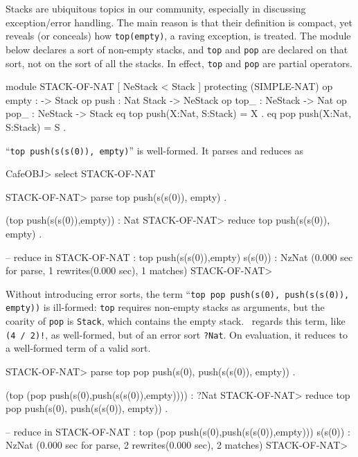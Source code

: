 \documentclass[a4paper]{memoir}
\begin{document}
Stacks are ubiquitous topics in our
community, especially in discussing exception/error handling. The
main reason is that their definition is compact, yet reveals (or
conceals) how \verb|top(empty)|, a raving exception, is treated.
The module below declares a sort of non-empty stacks, and
\verb|top| and \verb|pop| are declared on that sort, not on the sort of
all the stacks. In effect, \verb|top| and \verb|pop| are partial
operators.\label{exs:stack-of-nat}
\begin{vvtm}
\begin{ccode}
  module STACK-OF-NAT {
   [ NeStack < Stack ]
   protecting (SIMPLE-NAT) 
   op empty : -> Stack
   op push : Nat Stack -> NeStack
   op top_ : NeStack -> Nat
   op pop_ : NeStack -> Stack
   eq top push(X:Nat, S:Stack) = X .
   eq pop push(X:Nat, S:Stack) = S .
  }
\end{ccode}
\end{vvtm}
``\verb|top push(s(s(0)), empty)|'' is well-formed. It parses and reduces as
\begin{vvtm}
\begin{ccode}
  CafeOBJ> select STACK-OF-NAT

  STACK-OF-NAT> parse top push(s(s(0)), empty) .

 (top push(s(s(0)),empty)) : Nat
  STACK-OF-NAT> reduce top push(s(s(0)), empty) .

  -- reduce in STACK-OF-NAT : top push(s(s(0)),empty)
  s(s(0)) : NzNat
  (0.000 sec for parse, 1 rewrites(0.000 sec), 1 matches)
  STACK-OF-NAT> 
\end{ccode}
\end{vvtm}
Without introducing error sorts, the term
``\verb|top pop push(s(0), push(s(s(0)), empty))| is ill-formed:
\verb|top| requires non-empty stacks as arguments, but the coarity of
\verb|pop| is \verb|Stack|, which contains the empty stack.
\cafeobj~regards this term,
like \verb|(4 / 2)!|, as well-formed, but of an error sort \verb|?Nat|.
On evaluation, it reduces to a well-formed term of a valid sort.
\begin{vvtm}
\begin{ccode}
  STACK-OF-NAT> parse top pop push(s(0), push(s(s(0)), empty)) .

  (top (pop push(s(0),push(s(s(0)),empty)))) : ?Nat
  STACK-OF-NAT> reduce top pop push(s(0), push(s(s(0)), empty)) .

  -- reduce in STACK-OF-NAT : top (pop push(s(0),push(s(s(0)),empty)))
  s(s(0)) : NzNat
  (0.000 sec for parse, 2 rewrites(0.000 sec), 2 matches)
  STACK-OF-NAT> 
\end{ccode}
\end{vvtm}
\end{document}
